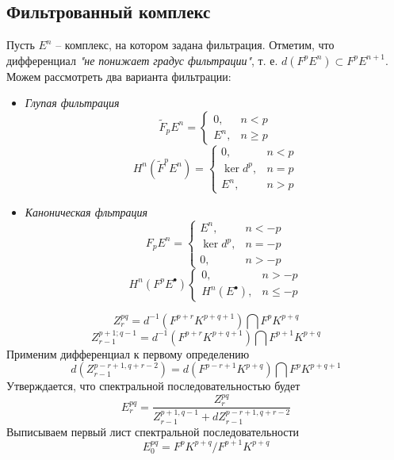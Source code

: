 \documentclass[../main.tex]{subfiles}
\begin{document}
\subsection{Фильтрованный комплекс}
Пусть $E^n$  -- комплекс, на котором задана фильтрация. Отметим, что дифференциал \textit{"не понижает градус фильтрации"}, т. е.  $d(F^pE^n)\subset F^p E^{n+1}$. Можем рассмотреть два варианта фильтрации:
\begin{itemize}
\item \textit{Глупая фильтрация}
\[
\widetilde{F}_p E^n = \begin{cases} 0, &n < p \\ E^n, & n \ge p \end{cases}
\]
\[
H^n(\widetilde{F}^p E^n) = \begin{cases} 0, &n < p\\ \ker d^p, & n=p \\ E^n, & n > p \end{cases}
\]
\bee
{}
\eee
\item \textit{Каноническая фльтрация}
\[
F_p E^n = \begin{cases} E^n, &n < -p \\ \ker d^p, & n = -p \\ 0, & n>-p \end{cases}
\]
\[
H^n (F^p E^\bullet) \begin{cases} 0, &n > -p \\ H^n(E^\bullet), & n\le-p \end{cases}
\]
\bee
{}
\eee
\end{itemize}
\begin{to_ex}
\end{to_ex}
\[
Z_r^{pq} = d^{-1}(F^{p+r}K^{p+q+1})\bigcap F^p K^{p+q}
\]
\[
Z^{p+1; q-1}_{r-1} = d^{-1}(F^{p+r}K^{p+q+1})\bigcap F^{p+1}K^{p+q}
\]
Применим дифференциал к первому определению 
\[
d (Z_{r-1}^{p-r+1, q+r-2}) = d( F^{p-r+1}K^{p+q})\bigcap F^p K^{p+q+1}
\]
Утверждается, что спектральной последовательностью будет
\[
E^{pq}_r = \dfrac{Z_r^{pq}}{Z^{p+1, q-1}_{r-1} + dZ_{r-1}^{p-r+1, q+r-2}}
\]
Выписываем первый лист спектральной последовательности 
\[
E_0^{pq} = F^p K^{p+q} / F^{p+1}K^{p+q}
\]
\end{document}
